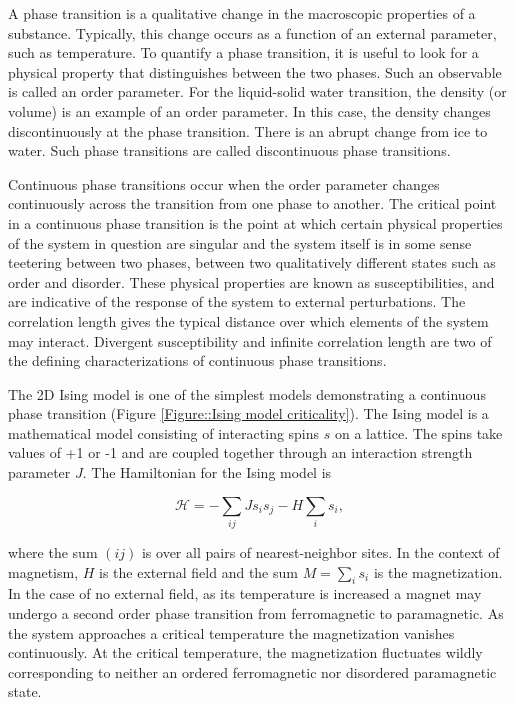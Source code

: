 \documentclass[12pt]{article}
\begin{document}
A phase transition is a qualitative change in the macroscopic properties of a substance. Typically, this change occurs as a function of an external parameter, such as temperature. To quantify a phase transition, it is useful to look for a physical property that distinguishes between the two phases. Such an observable is called an order parameter. For the liquid-solid water transition, the density (or volume) is an example of an order parameter. In this case, the density changes discontinuously at the phase transition. There is an abrupt change from ice to water. Such phase transitions are called discontinuous phase transitions.

Continuous phase transitions occur when the order parameter changes continuously across the transition from one phase to another. The critical point in a continuous phase transition is the point at which certain physical properties of the system in question are singular and the system itself is in some sense teetering between two phases, between two qualitatively different states such as order and disorder. These physical properties are known as susceptibilities, and are indicative of the response of the system to external perturbations. The correlation length gives the typical distance over which elements of the system may interact. Divergent susceptibility and infinite correlation length are two of the defining characterizations of continuous phase transitions.

The 2D Ising model is one of the simplest models demonstrating a continuous phase transition (Figure \ref{Figure::Ising model criticality}). The Ising model is a mathematical model consisting of interacting spins $s$ on a lattice. The spins take values of +1 or -1 and are coupled together through an interaction strength parameter $J$. The Hamiltonian for the Ising model is

\begin{equation}
\mathcal{H} = - \sum_{ij}Js_{i}s_{j} - H\sum_{i}s_{i},
\end{equation}

\noindent where the sum $(ij)$ is over all pairs of nearest-neighbor sites. In the context of magnetism, $H$ is the external field and the sum $M=\sum\limits_{i} s_{i}$ is the magnetization. In the case of no external field, as its temperature is increased a magnet may undergo a second order phase transition from ferromagnetic to paramagnetic. As the system approaches a critical temperature the magnetization vanishes continuously. At the critical temperature, the magnetization fluctuates wildly corresponding to neither an ordered ferromagnetic nor disordered paramagnetic state.
\end{document}
